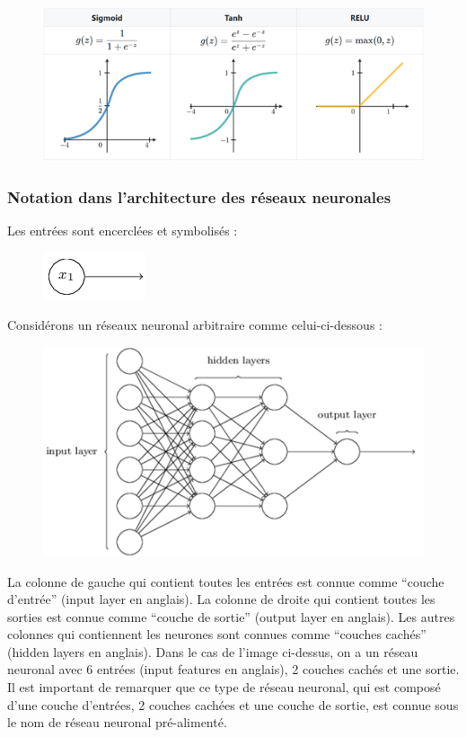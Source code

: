 \documentclass[conference,onecolumn]{IEEEtran}
\begin{document}
 \begin{figure}[H]
 \centering
    \includegraphics[scale=0.7]{img11.png}
\end{figure}


\subsubsection{Notation dans l’architecture des réseaux neuronales}
Les entrées sont encerclées et symbolisés : 

 \begin{figure}[H]
 \centering
    \includegraphics[scale=0.5]{img12.png}
\end{figure}

Considérons un réseaux neuronal arbitraire comme celui-ci-dessous : 

 \begin{figure}[H]
 \centering
    \includegraphics[scale=0.7]{img13.png}
\end{figure}


La colonne de gauche qui contient toutes les entrées est connue comme “couche d’entrée” (input layer en anglais). La colonne de droite qui contient toutes les sorties est connue comme “couche de sortie” (output layer en anglais). Les autres colonnes qui contiennent les neurones sont connues comme “couches cachés” (hidden layers en anglais). Dans le cas de l’image ci-dessus, on a un réseau neuronal avec 6 entrées (input features en anglais), 2 couches cachés et une sortie.  Il est important de remarquer que ce type de réseau neuronal, qui est composé d’une couche d’entrées, 2 couches cachées et une couche de sortie, est connue sous le nom de réseau neuronal pré-alimenté.
\hfill\\
\end{document}
